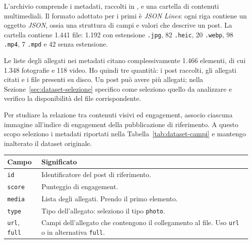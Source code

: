 L'archivio comprende i metadati, raccolti in , e una cartella di contenuti multimediali. Il formato adottato per i primi è \emph{JSON Lines}: ogni riga contiene un oggetto \emph{JSON}, ossia una struttura di campi e valori che descrive un post. La cartella  contiene 1.441 file: 1.192 con estensione \texttt{.jpg}, 82 \texttt{.heic}, 20 \texttt{.webp}, 98 \texttt{.mp4}, 7 \texttt{.mpd} e 42 senza estensione.

Le liste degli allegati nei metadati citano complessivamente 1.466 elementi, di cui 1.348 fotografie e 118 video. Ho quindi tre quantità: i post raccolti, gli allegati citati e i file presenti su disco. Un post può avere più allegati; nella Sezione~\ref{sec:dataset-selezione} specifico come seleziono quello da analizzare e verifico la disponibilità del file corrispondente.

Per studiare la relazione tra contenuti visivi ed engagement, associo ciascuna immagine all’indice di engagement della pubblicazione di riferimento. A questo scopo seleziono i metadati riportati nella Tabella~\ref{tab:dataset-campi} e mantengo inalterato il dataset originale.

\bigskip\noindent
\begin{minipage}{\linewidth}
    \centering
    \makeatletter{}\makeatother
    \caption{Campi utilizzati per associare un post alla sua immagine e al risultato di engagement. I campi \texttt{type}, \texttt{url} e \texttt{full} appartengono all'allegato selezionato nella lista \texttt{media}~\cite{DVN/SCCQYD_2019}.}
    \label{tab:dataset-campi}
    \begin{tabular}{@{}lp{}@{}}
        \toprule
        Campo & Significato \\
        \midrule
        \texttt{id} & Identificatore del post di riferimento. \\
        \texttt{score} & Punteggio di engagement. \\
        \texttt{media} & Lista degli allegati. Prendo il primo elemento. \\
        \texttt{type} & Tipo dell'allegato: seleziono il tipo \texttt{photo}. \\
        \texttt{url}, \texttt{full} & Campi dell'allegato che contengono il collegamento al file. Uso \texttt{url} o in alternativa \texttt{full}. \\
        \bottomrule
    \end{tabular}
\end{minipage}
\bigskip

